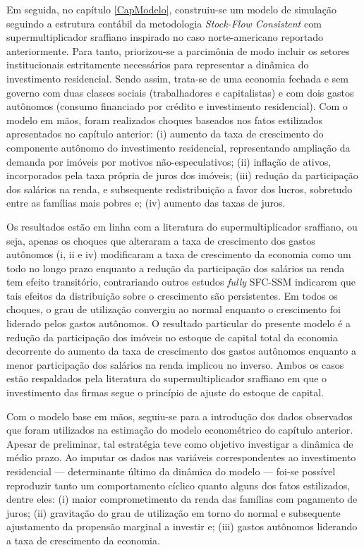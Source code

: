 Em seguida, no capítulo \ref{CapModelo}, construiu-se um modelo de simulação seguindo a estrutura contábil da metodologia \textit{Stock-Flow Consistent} com supermultiplicador sraffiano inspirado no caso norte-americano reportado anteriormente.
Para tanto, priorizou-se a parcimônia de modo incluir os setores institucionais estritamente necessários para representar a dinâmica do investimento residencial.
Sendo assim, trata-se de uma economia fechada e sem governo com duas classes sociais (trabalhadores e capitalistas) e com dois gastos autônomos (consumo financiado por crédito e investimento residencial).
Com o modelo em mãos, foram realizados choques baseados nos fatos estilizados apresentados no capítulo anterior: (i) aumento da taxa de crescimento do componente autônomo do investimento residencial, representando ampliação da demanda por imóveis por motivos não-especulativos; (ii) inflação de ativos, incorporados pela taxa própria de juros dos imóveis; (iii) redução da participação dos salários na renda, e subsequente redistribuição a favor dos lucros, sobretudo entre as famílias mais pobres e; (iv) aumento das taxas de juros.


Os resultados estão em linha com a literatura do supermultiplicador sraffiano, ou seja, apenas os choques que alteraram a taxa de crescimento dos gastos autônomos (i, ii e iv) modificaram a taxa de crescimento da economia como um todo no longo prazo enquanto a redução da participação dos salários na renda tem efeito transitório, contrariando outros estudos \textit{fully} SFC-SSM indicarem que tais efeitos da distribuição sobre o crescimento são persistentes.
Em todos os choques, o grau de utilização convergiu ao normal enquanto o crescimento foi liderado pelos gastos autônomos.
O resultado particular do presente modelo é a redução da participação dos imóveis no estoque de capital total da economia decorrente do aumento da taxa de crescimento dos gastos autônomos enquanto a menor participação dos salários na renda implicou no inverso.
Ambos os casos estão respaldados pela literatura do supermultiplicador sraffiano em que o investimento das firmas segue o princípio de ajuste do estoque de capital.


Com o modelo base em mãos, seguiu-se para a introdução dos dados observados que foram utilizados na estimação do modelo econométrico do capítulo anterior.
Apesar de preliminar, tal estratégia teve como objetivo investigar a dinâmica de médio prazo.
Ao imputar os dados nas variáveis correspondentes ao investimento residencial --- determinante último da dinâmica do modelo --- foi-se possível reproduzir tanto um comportamento cíclico quanto alguns dos fatos estilizados, dentre eles: (i) maior comprometimento da renda das famílias com pagamento de juros; (ii) gravitação do grau de utilização em torno do normal e subsequente ajustamento da propensão marginal a investir e; (iii) gastos autônomos liderando a taxa de crescimento da economia.

